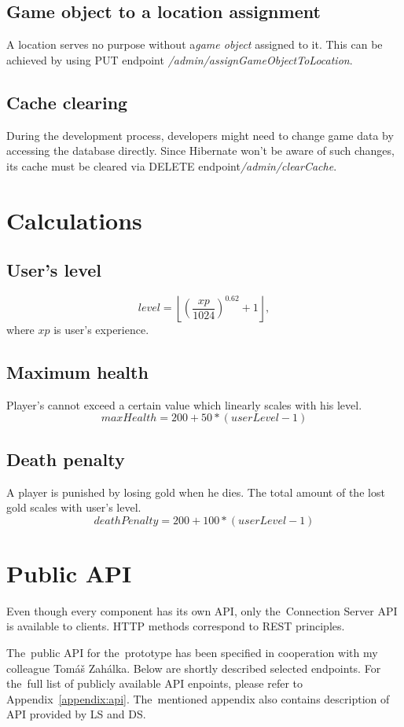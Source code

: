 	\subsection{Game object to a location assignment}
	A location serves no purpose without a\textit{game object} assigned to it. This can be achieved by using PUT endpoint \mbox{\textit{/admin/assignGameObjectToLocation}}.
	
	\subsection{Cache clearing}
	During the development process, developers might need to change game data by accessing the database directly. Since Hibernate won't be aware of such changes, its cache must be cleared via DELETE endpoint\mbox{\textit{/admin/clearCache}}.

\section{Calculations}
	\subsection{User's level}
	\[ level = \left\lfloor{\left(\frac{xp}{1024}\right)^{0.62} + 1}\right\rfloor, \]
	where $xp$ is user's experience.
	\subsection{Maximum health}
	Player's cannot exceed a certain value which linearly scales with his level.
	\[ maxHealth = 200 + 50 * (userLevel - 1) \]
	
	\subsection{Death penalty}
	A player is punished by losing gold when he dies. The total amount of the lost gold scales with user's level.
	\[ deathPenalty = 200 + 100 * (userLevel - 1) \]

\section{Public API}
Even though every component has its own API, only the~Connection Server API is available to clients. HTTP methods correspond to REST principles.

The~public API for the~prototype has been specified in cooperation with my colleague Tomáš Zahálka. Below are shortly described selected endpoints. For the~full list of publicly available API enpoints, please refer to Appendix~\ref{appendix:api}. The~mentioned appendix also contains description of API provided by LS and DS. 	

